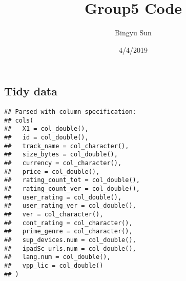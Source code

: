 \documentclass[]{article}
\title{Group5 Code}
\author{Bingyu Sun}
\date{4/4/2019}
\newenvironment{Shaded}{\begin{snugshade}}{\end{snugshade}}
\newcommand{\KeywordTok}[1]{\textcolor[rgb]{0.13,0.29,0.53}{\textbf{#1}}}
\newcommand{\DataTypeTok}[1]{\textcolor[rgb]{0.13,0.29,0.53}{#1}}
\newcommand{\DecValTok}[1]{\textcolor[rgb]{0.00,0.00,0.81}{#1}}
\newcommand{\FloatTok}[1]{\textcolor[rgb]{0.00,0.00,0.81}{#1}}
\newcommand{\StringTok}[1]{\textcolor[rgb]{0.31,0.60,0.02}{#1}}
\newcommand{\CommentTok}[1]{\textcolor[rgb]{0.56,0.35,0.01}{\textit{#1}}}
\newcommand{\OperatorTok}[1]{\textcolor[rgb]{0.81,0.36,0.00}{\textbf{#1}}}
\newcommand{\NormalTok}[1]{#1}
\begin{document}
\maketitle

\subsection{Tidy data}\label{tidy-data}

\begin{Shaded}
\end{Shaded}

\begin{verbatim}
## Parsed with column specification:
## cols(
##   X1 = col_double(),
##   id = col_double(),
##   track_name = col_character(),
##   size_bytes = col_double(),
##   currency = col_character(),
##   price = col_double(),
##   rating_count_tot = col_double(),
##   rating_count_ver = col_double(),
##   user_rating = col_double(),
##   user_rating_ver = col_double(),
##   ver = col_character(),
##   cont_rating = col_character(),
##   prime_genre = col_character(),
##   sup_devices.num = col_double(),
##   ipadSc_urls.num = col_double(),
##   lang.num = col_double(),
##   vpp_lic = col_double()
## )
\end{verbatim}
\end{document}
